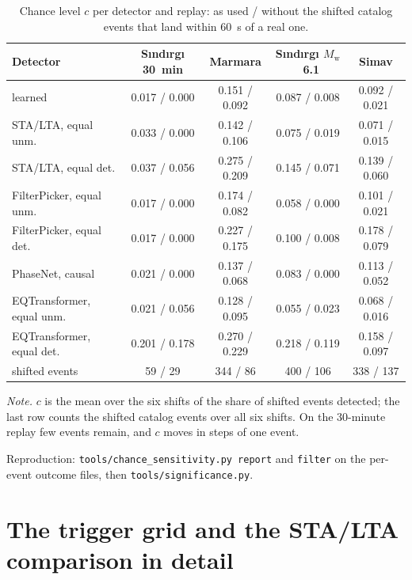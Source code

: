 \documentclass[11pt,a4paper]{article}
\newcommand{\Mw}{$M_\mathrm{w}$}
\newcommand{\stalta}{STA/LTA}
\newcommand{\tool}[1]{\nolinkurl{#1}}
\newcommand{\tablenote}[1]{\par\vspace{4pt}%
  \begin{minipage}{\linewidth}\footnotesize\textit{Note.} #1
\end{minipage}}
\begin{document}
\begin{table}[htbp]
  \centering\footnotesize\setlength{\tabcolsep}{4pt}
  \caption{Chance level $c$ per detector and replay: as used / without the shifted
  catalog events that land within 60~s of a real one.}\label{t:chance}
  \begin{tabular}{@{}lcccc@{}}
    \toprule
    Detector & S\i{}nd\i{}rg\i{} 30~min & Marmara & S\i{}nd\i{}rg\i{} \Mw{}~6.1 & Simav \\
    \midrule
    learned                   & 0.017 / 0.000 & 0.151 / 0.092 & 0.087 / 0.008 & 0.092 / 0.021 \\
    \stalta{}, equal unm.     & 0.033 / 0.000 & 0.142 / 0.106 & 0.075 / 0.019 & 0.071 / 0.015 \\
    \stalta{}, equal det.     & 0.037 / 0.056 & 0.275 / 0.209 & 0.145 / 0.071 & 0.139 / 0.060 \\
    FilterPicker, equal unm.  & 0.017 / 0.000 & 0.174 / 0.082 & 0.058 / 0.000 & 0.101 / 0.021 \\
    FilterPicker, equal det.  & 0.017 / 0.000 & 0.227 / 0.175 & 0.100 / 0.008 & 0.178 / 0.079 \\
    PhaseNet, causal          & 0.021 / 0.000 & 0.137 / 0.068 & 0.083 / 0.000 & 0.113 / 0.052 \\
    EQTransformer, equal unm. & 0.021 / 0.056 & 0.128 / 0.095 & 0.055 / 0.023 & 0.068 / 0.016 \\
    EQTransformer, equal det. & 0.201 / 0.178 & 0.270 / 0.229 & 0.218 / 0.119 & 0.158 / 0.097 \\
    \midrule
    shifted events            & 59 / 29 & 344 / 86 & 400 / 106 & 338 / 137 \\
    \bottomrule
  \end{tabular}
  \tablenote{$c$ is the mean over the six shifts of the share of shifted events
    detected; the last row counts the shifted catalog events over all six shifts.
  On the 30-minute replay few events remain, and $c$ moves in steps of one event.}
\end{table}

\noindent Reproduction: \tool{tools/chance_sensitivity.py report} and \tool{filter}
on the per-event outcome files, then \tool{tools/significance.py}.

\clearpage
\section{The trigger grid and the STA/LTA comparison in detail}\label{s:grid}
\end{document}
